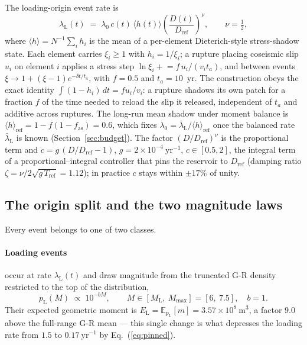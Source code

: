 \documentclass[11pt]{article}
\newcommand{\Mmax}{M_{\max}}
\newcommand{\ML}{M_{\mathrm{L}}}
\newcommand{\Dres}{D}
\newcommand{\Dref}{D_{\mathrm{ref}}}
\newcommand{\fas}{f_{\mathrm{as}}}
\newcommand{\EL}{E_{\mathrm{L}}}
\newcommand{\lamL}{\lambda_{\mathrm{L}}}
\begin{document}
The loading-origin event rate is
\begin{equation}
  \lamL(t) \;=\; \lambda_0\, c(t)\, \langle h(t)\rangle
  \left(\frac{\Dres(t)}{\Dref}\right)^{\nu},
  \qquad \nu = \tfrac12 ,
\label{eq:rate}
\end{equation}
where $\langle h\rangle = N^{-1}\sum_i h_i$ is the mean of a per-element Dieterich-style
stress-shadow state. Each element carries $\xi_i \ge 1$ with $h_i = 1/\xi_i$; a rupture
placing coseismic slip $u_i$ on element $i$ applies a stress step
$\ln\xi_i \mathrel{+}= f\,u_i/(v_i t_a)$, and between events
$\xi \to 1 + (\xi-1)e^{-\delta t/t_a}$, with $f = 0.5$ and $t_a = 10$~yr. The
construction obeys the exact identity $\int (1-h_i)\,dt = f u_i / v_i$: a rupture
shadows its own patch for a fraction $f$ of the time needed to reload the slip it
released, independent of $t_a$ and additive across ruptures. The long-run mean shadow
under moment balance is $\langle h\rangle_{\mathrm{ref}} = 1 - f(1-\fas) = 0.6$, which
fixes $\lambda_0 = \bar\lambda_{\mathrm{L}}/\langle h\rangle_{\mathrm{ref}}$ once the
balanced rate $\bar\lambda_{\mathrm{L}}$ is known (Section~\ref{sec:budget}). The factor
$(\Dres/\Dref)^{\nu}$ is the proportional term and
$\dot c = g\,(\Dres/\Dref - 1)$, $g = 2\times10^{-4}\ \mathrm{yr^{-1}}$,
$c\in[0.5,2]$, the integral term of a proportional--integral controller that pins the
reservoir to $\Dref$ (damping ratio $\zeta = \nu/2\sqrt{g\,T_{\mathrm{ref}}} = 1.12$);
in practice $c$ stays within $\pm17\%$ of unity.

\subsection{The origin split and the two magnitude laws}
\label{sec:split}

Every event belongs to one of two classes.

\paragraph{Loading events} occur at rate $\lamL(t)$ and draw magnitude from the
truncated G-R density restricted to the top of the distribution,
\begin{equation}
  p_{\mathrm{L}}(M) \;\propto\; 10^{-bM}, \qquad M \in [\ML,\ \Mmax] = [6,\ 7.5],
  \quad b = 1 .
\label{eq:loadlaw}
\end{equation}
Their expected geometric moment is
$\EL = \mathbb{E}_{p_{\mathrm{L}}}[m] = 3.57\times10^{8}\ \mathrm{m^3}$, a factor $9.0$
above the full-range G-R mean --- this single change is what depresses the loading rate
from $1.5$ to $0.17\ \mathrm{yr^{-1}}$ by Eq.~(\ref{eq:pinned}).
\end{document}
